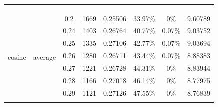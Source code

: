 \begin{table}[H]
{\begin{tabular}{|cccccccc|}
  \multicolumn{1}{c|}{} &
  \multicolumn{1}{c|}{} &
  \multicolumn{1}{c|}{} &
  \multicolumn{1}{c|}{} &
  \multicolumn{1}{c|}{} &
  \multicolumn{1}{c|}{} &
   \\
\multicolumn{1}{|c|}{} &
  \multicolumn{1}{c|}{} &
  \multicolumn{1}{c|}{} &
  \multicolumn{1}{c|}{} &
  \multicolumn{1}{c|}{} &
  \multicolumn{1}{c|}{} &
  \multicolumn{1}{c|}{} &
   \\ 
\multicolumn{1}{|c|}{} &
  \multicolumn{1}{c|}{} &
  \multicolumn{1}{c|}{} &
  \multicolumn{1}{c|}{} &
  \multicolumn{1}{c|}{} &
  \multicolumn{1}{c|}{} &
  \multicolumn{1}{c|}{} &
   \\ \hline
\multicolumn{1}{|c|}{\multirow{23}{*}{cosine}} &
  \multicolumn{1}{c|}{\multirow{12}{*}{average}} &
  \multicolumn{1}{c|}{0.2} &
  \multicolumn{1}{c|}{1669} &
  \multicolumn{1}{c|}{0.25506} &
  \multicolumn{1}{c|}{33.97\%} &
  \multicolumn{1}{c|}{0\%} &
  9.60789 \\ \cline{3-8} 
\multicolumn{1}{|c|}{} &
  \multicolumn{1}{c|}{} &
  \multicolumn{1}{c|}{0.24} &
  \multicolumn{1}{c|}{1403} &
  \multicolumn{1}{c|}{0.26764} &
  \multicolumn{1}{c|}{40.77\%} &
  \multicolumn{1}{c|}{0.07\%} &
  9.03752 \\ \cline{3-8} 
\multicolumn{1}{|c|}{} &
  \multicolumn{1}{c|}{} &
  \multicolumn{1}{c|}{0.25} &
  \multicolumn{1}{c|}{1335} &
  \multicolumn{1}{c|}{0.27106} &
  \multicolumn{1}{c|}{42.77\%} &
  \multicolumn{1}{c|}{0.07\%} &
  9.03694 \\ \cline{3-8} 
\multicolumn{1}{|c|}{} &
  \multicolumn{1}{c|}{} &
  \multicolumn{1}{c|}{0.26} &
  \multicolumn{1}{c|}{1280} &
  \multicolumn{1}{c|}{0.26711} &
  \multicolumn{1}{c|}{43.44\%} &
  \multicolumn{1}{c|}{0.07\%} &
  8.88383 \\ \cline{3-8} 
\multicolumn{1}{|c|}{} &
  \multicolumn{1}{c|}{} &
  \multicolumn{1}{c|}{0.27} &
  \multicolumn{1}{c|}{1221} &
  \multicolumn{1}{c|}{0.26728} &
  \multicolumn{1}{c|}{44.31\%} &
  \multicolumn{1}{c|}{0\%} &
  8.83944 \\ \cline{3-8} 
\multicolumn{1}{|c|}{} &
  \multicolumn{1}{c|}{} &
  \multicolumn{1}{c|}{0.28} &
  \multicolumn{1}{c|}{1166} &
  \multicolumn{1}{c|}{0.27018} &
  \multicolumn{1}{c|}{46.14\%} &
  \multicolumn{1}{c|}{0\%} &
  8.77975 \\ \cline{3-8} 
\multicolumn{1}{|c|}{} &
  \multicolumn{1}{c|}{} &
  \multicolumn{1}{c|}{0.29} &
  \multicolumn{1}{c|}{1121} &
  \multicolumn{1}{c|}{0.27126} &
  \multicolumn{1}{c|}{47.55\%} &
  \multicolumn{1}{c|}{0\%} &
  8.76839 \\ \cline{3-8} 

\end{tabular}}
\end{table}
